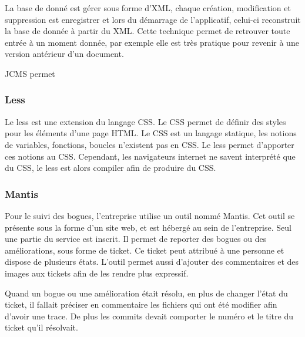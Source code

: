 \documentclass[12pt,a4paper]{article}
\begin{document}
La base de donné est gérer sous forme d'XML, chaque création, modification et suppression est enregistrer et lors du démarrage de l'applicatif, celui-ci reconstruit la base de donnée à partir du XML. Cette technique permet de retrouver toute entrée à un moment donnée, par exemple elle est très pratique pour revenir à une version antérieur d'un document.\par
\medskip
JCMS permet 

\subsubsection{Less}
Le less est une extension du langage CSS. Le CSS permet de définir des styles pour les éléments d'une page HTML. Le CSS est un langage statique, les notions de variables, fonctions, boucles n'existent pas en CSS. Le less permet d'apporter ces notions au CSS. Cependant, les navigateurs internet ne savent interprété que du CSS, le less est alors compiler afin de produire du CSS.

\subsubsection{Mantis}
Pour le suivi des bogues, l'entreprise utilise un outil nommé Mantis. Cet outil se présente sous la forme d'un site web, et est hébergé au sein de l'entreprise. Seul une partie du service est inscrit. Il permet de reporter des bogues ou des améliorations, sous forme de ticket. Ce ticket peut attribué à une personne et dispose de plusieurs états. L'outil permet aussi d'ajouter des commentaires et des images aux tickets afin de les rendre plus expressif.\par 
Quand un bogue ou une amélioration était résolu, en plus de changer l'état du ticket, il fallait préciser en commentaire les fichiers qui ont été modifier afin d'avoir une trace. De plus les commits devait comporter le numéro et le titre du ticket qu'il résolvait.\par
\end{document}
